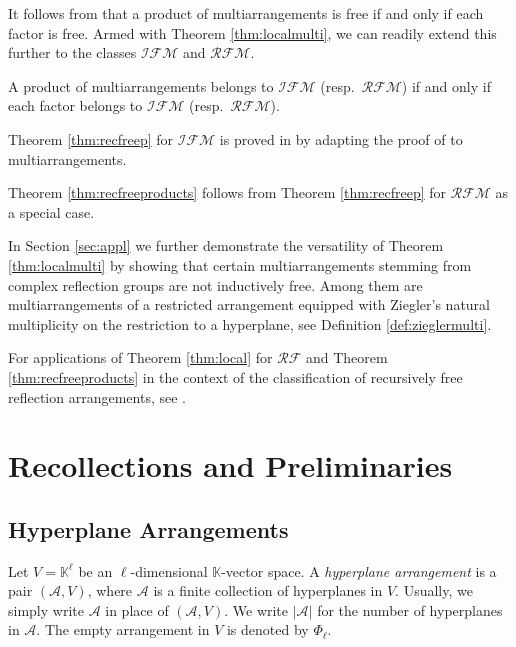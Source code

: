 It follows from \cite[Lem.\ 1.3]{abeteraowakefield:euler} 
that a product of multiarrangements is free if and only if 
each factor is free. 
Armed with Theorem \ref{thm:localmulti}, we can readily 
extend this further to the classes
${{\mathcal {IFM}}}$ and ${{\mathcal {RFM}}}$.

\begin{theorem}
\label{thm:recfreep}
A product of multiarrangements belongs to 
${{\mathcal {IFM}}}$ (resp.\ ${{\mathcal {RFM}}}$) if and only if 
each factor belongs to ${{\mathcal {IFM}}}$ (resp.\ ${{\mathcal {RFM}}}$).
\end{theorem}

Theorem \ref{thm:recfreep} 
for ${{\mathcal {IFM}}}$ is proved in 
\cite[Prop.\ 2.11]{conrad} by adapting
the proof of \cite[Prop.\ 2.10]{hogeroehrle:indfree}
to multiarrangements.

Theorem \ref{thm:recfreeproducts} follows from 
Theorem \ref{thm:recfreep} for ${{\mathcal {RFM}}}$ as a special case. 

\bigskip

In Section \ref{sec:appl} we further demonstrate the versatility of 
Theorem \ref{thm:localmulti} by showing that 
certain multiarrangements stemming 
from complex reflection groups are not inductively 
free.
Among them are multiarrangements of a restricted arrangement
equipped with Ziegler's natural multiplicity 
on the restriction to a hyperplane, 
see Definition \ref{def:zieglermulti}.

For applications of 
Theorem \ref{thm:local} for ${{\mathcal {RF}}}$ and 
Theorem \ref{thm:recfreeproducts}
in the context of the 
classification of recursively free reflection arrangements,
see \cite{muecksch:recfree}.

\section{Recollections and Preliminaries}

\subsection{Hyperplane Arrangements}
\label{ssect:hyper}
Let $V = {{\mathbb K}}^\ell$ 
be an $\ell$-dimensional ${{\mathbb K}}$-vector space.
A \emph{hyperplane arrangement} is a pair
$({{\mathcal A}}, V)$, where ${{\mathcal A}}$ is a finite collection of hyperplanes in $V$.
Usually, we simply write ${{\mathcal A}}$ in place of $({{\mathcal A}}, V)$.
We write $|{{\mathcal A}}|$ for the number of hyperplanes in ${{\mathcal A}}$.
The empty arrangement in $V$ is denoted by $\Phi_\ell$.

